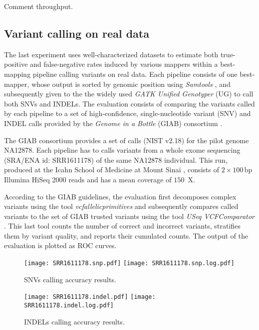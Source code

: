 Comment throughput.

\subsection{Variant calling on real data}
\label{sec:yara:eval:calling}


The last experiment uses well-characterized datasets to estimate both true-positive and false-negative rates induced by various mappers within a best-mapping pipeline calling variants on real data.
Each pipeline consists of one best-mapper, whose output is sorted by genomic position using \emph{Samtools} \citep{Li2009}, and subsequently given to the the widely used \emph{GATK Unified Genotyper} (UG) \citep{DePristo2011} to call both SNVs and INDELs.
The evaluation consists of comparing the variants called by each pipeline to a set of high-confidence, single-nucleotide variant (SNV) and INDEL calls provided by the \emph{Genome in a Bottle} (GIAB) consortium \citep{Zook2014}.

The GIAB consortium provides a set of calls (NIST v2.18) for the pilot genome NA12878.
Each pipeline has to calls variants from a whole exome sequencing (SRA/ENA id: SRR1611178) of the same NA12878 individual.
This run, produced at the Icahn School of Medicine at Mount Sinai \citep{Linderman2014}, consists of $2 \times 100\,\text{bp}$ Illumina HiSeq 2000 reads and has a mean coverage of $150$~X.

According to the GIAB guidelines, the evaluation first decomposes complex variants using the tool \emph{vcfallelicprimitives} \citep{Danecek2011} and subsequently compares called variants to the set of GIAB trusted variants using the tool \emph{USeq VCFComparator} \citep{Nix2008}.
This last tool counts the number of correct and incorrect variants, stratifies them by variant quality, and reports their cumulated counts.
The output of the evaluation is plotted as ROC curves.

\begin{figure}[t]
\begin{center}
\caption[SNPs calling accuracy results]{SNVs calling accuracy results.}
\label{fig:yara:calling-snps}
\texttt{[image: SRR1611178.snp.pdf]}
\texttt{[image: SRR1611178.snp.log.pdf]}
\end{center}
\end{figure}

\begin{figure}[t]
\begin{center}
\caption[INDELs calling accuracy results]{INDELs calling accuracy results.}
\label{fig:yara:calling-indels}
\texttt{[image: SRR1611178.indel.pdf]}
\texttt{[image: SRR1611178.indel.log.pdf]}
\end{center}
\end{figure}

